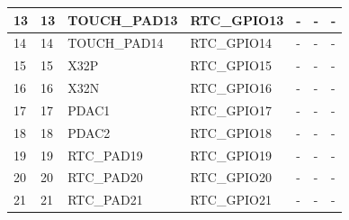 \begin{longtable}[c]{|p{2.3cm}|p{1.5cm}|p{2.5cm}|p{2.2cm}|p{2.2cm}|p{2.2cm}|p{2.6cm}| }
\hline
13 & 13 & TOUCH\_PAD13   & RTC\_GPIO13       & -     & -  &  -         \\
\hline
14 & 14 & TOUCH\_PAD14   & RTC\_GPIO14       & -     & -  &  -         \\
\hline
15 & 15 &  X32P & RTC\_GPIO15           & -     & -  &  -         \\
\hline
16 & 16 & X32N & RTC\_GPIO16           &  -     & -  &  -         \\
\hline
17 & 17 & PDAC1 & RTC\_GPIO17           & -     & -  &  -         \\
\hline
18 & 18 & PDAC2 & RTC\_GPIO18           & -     & -  &  -         \\
\hline
19 & 19 & RTC\_PAD19 & RTC\_GPIO19           & -     & -  &  -         \\
\hline
20 & 20 & RTC\_PAD20 & RTC\_GPIO20           &  -    & -  &  -         \\
\hline
21 & 21 & RTC\_PAD21 & RTC\_GPIO21           &  -    & -  &  -         \\
\hline

\end{longtable}
